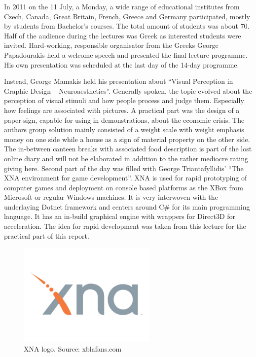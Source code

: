 \documentclass[bibtotocnumbered, headsepline,normalheadings,12pt]{report}
\begin{document}
In 2011 on the 11 July, a Monday,  a wide range of educational institutes from Czech, Canada, Great Britain, French, Greece and Germany participated, mostly by
students from Bachelor's courses. The total amount of students was about 70. Half of the audience during the lectures was 
Greek as interested students were invited. Hard-working, responsible organisator from the Greeks George Papadourakis held a
welcome speech and presented the final lecture programme. His own presentation was scheduled at the last day of the 14-day programme.

Instead, George Mamakis held his presentation about ``Visual Perception in Graphic Design – Neuroaesthetics''. Generally spoken, the 
topic evolved about the perception of visual stimuli and how people process and judge them. Especially how feelings are associated 
with pictures. A practical part was the design of a paper sign, capable for using in demonstrations, about the economic crisis. The
authors group solution mainly consisted of a weight scale with weight emphasis money on one side while a house as a sign of material property on 
the other side.
The in-between canteen breaks with associated food description is part of the lost online diary and will not be elaborated in addition to the 
rather mediocre rating giving here.
Second part of the day was filled with George Triantafyllidis' ``The XNA environment for game development''. XNA is used for rapid prototyping of 
computer games and deployment on console based platforms as the XBox from Microsoft or regular Windows machines. It is very interwoven with the
underlaying Dotnet framework and centers around C\# for its main programming language. It has an in-build graphical engine with wrappers for 
Direct3D for acceleration. The idea for rapid development was taken from this lecture for the practical part of this report.

\begin{figure}[H]
    \centering
    \includegraphics[width=0.6\textwidth]{xna.png}%
    \caption{XNA logo. Source: xblafans.com}
    \label{fig:xna}%
\end{figure}
\end{document}
